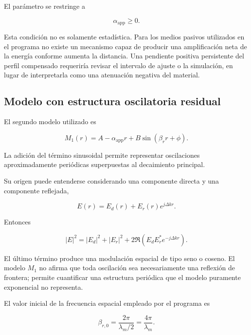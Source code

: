 El parámetro se restringe a

\begin{equation}
\alpha_{\mathrm{app}}\geq0.
\end{equation}

Esta condición no es solamente estadística. Para los medios pasivos utilizados en el programa no existe un mecanismo capaz de producir una amplificación neta de la energía conforme aumenta la distancia. Una pendiente positiva persistente del perfil compensado requeriría revisar el intervalo de ajuste o la simulación, en lugar de interpretarla como una atenuación negativa del material.

\subsection{Modelo con estructura oscilatoria residual}

El segundo modelo utilizado es

\begin{equation}
M_1(r)
=
A
-
\alpha_{\mathrm{app}}r
+
B\sin(\beta_r r+\phi).
\label{eq:M1}
\end{equation}

La adición del término sinusoidal permite representar oscilaciones aproximadamente periódicas superpuestas al decaimiento principal.

Su origen puede entenderse considerando una componente directa y una componente reflejada,

\begin{equation}
E(r)
=
E_d(r)
+
E_r(r)e^{j\Delta k r}.
\end{equation}

Entonces

\begin{equation}
|E|^2
=
|E_d|^2
+
|E_r|^2
+
2\Re
\left(
E_dE_r^{*}
e^{-j\Delta kr}
\right).
\end{equation}

El último término produce una modulación espacial de tipo seno o coseno. El modelo $M_1$ no afirma que toda oscilación sea necesariamente una reflexión de frontera; permite cuantificar una estructura periódica que el modelo puramente exponencial no representa.

El valor inicial de la frecuencia espacial empleado por el programa es

\begin{equation}
\beta_{r,0}
=
\frac{2\pi}{\lambda_m/2}
=
\frac{4\pi}{\lambda_m}.
\end{equation}

